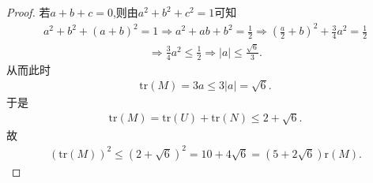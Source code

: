 \documentclass[../../main.tex]{subfiles}
\begin{document}
\begin{proof}
若$a+b+c=0$,则由$a^2+b^2+c^2=1$可知
\begin{align*}
a^2+b^2+(a+b)^2=1\Rightarrow a^2+ab+b^2=\frac{1}{2}\Rightarrow \left( \frac{a}{2}+b \right) ^2+\frac{3}{4}a^2=\frac{1}{2}
\end{align*}
\begin{align*}
\Rightarrow \frac{3}{4}a^2\leqslant \frac{1}{2}\Rightarrow |a|\leqslant \frac{\sqrt{6}}{3}.
\end{align*}
从而此时
\begin{align*}
\mathrm{tr}(M) =3a\leqslant 3|a|=\sqrt{6}.
\end{align*}
于是
\begin{align*}
\mathrm{tr}(M) =\mathrm{tr}(U) +\mathrm{tr}(N) \leqslant 2+\sqrt{6}.
\end{align*}
故
\begin{align*}
(\mathrm{tr}(M))^2\leqslant \left( 2+\sqrt{6} \right) ^2=10+4\sqrt{6}=\left( 5+2\sqrt{6} \right) \mathrm{r}(M).
\end{align*}
\end{proof}
\end{document}
